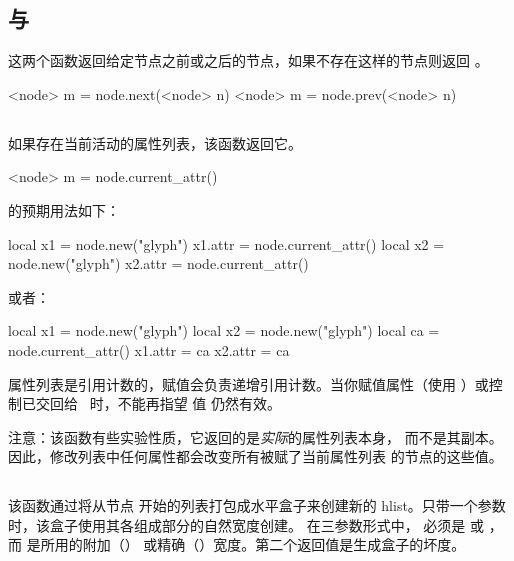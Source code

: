 \subsection{ 与 }


这两个函数返回给定节点之前或之后的节点，如果不存在这样的节点则返回
。

\begin{typing}
<node> m =
    node.next(<node> n)
<node> m =
    node.prev(<node> n)
\end{typing}

\subsection{}


如果存在当前活动的属性列表，该函数返回它。

\begin{typing}
<node> m =
    node.current_attr()
\end{typing}

 的预期用法如下：

\begin{typing}
local x1 = node.new("glyph")
x1.attr = node.current_attr()
local x2 = node.new("glyph")
x2.attr = node.current_attr()
\end{typing}

或者：

\begin{typing}
local x1 = node.new("glyph")
local x2 = node.new("glyph")
local ca = node.current_attr()
x1.attr = ca
x2.attr = ca
\end{typing}

属性列表是引用计数的，赋值会负责递增引用计数。当你赋值属性（使用
）或控制已交回给 \TEX\ 时，不能再指望
值  仍然有效。

注意：该函数有些实验性质，它返回的是{\it 实际}的属性列表本身，
而不是其副本。因此，修改列表中任何属性都会改变所有被赋了当前属性列表
的节点的这些值。

\subsection{}


该函数通过将从节点  开始的列表打包成水平盒子来创建新的
hlist。只带一个参数时，该盒子使用其各组成部分的自然宽度创建。
在三参数形式中， 必须是  或
，而  是所用的附加（）
或精确（）宽度。第二个返回值是生成盒子的坏度。

